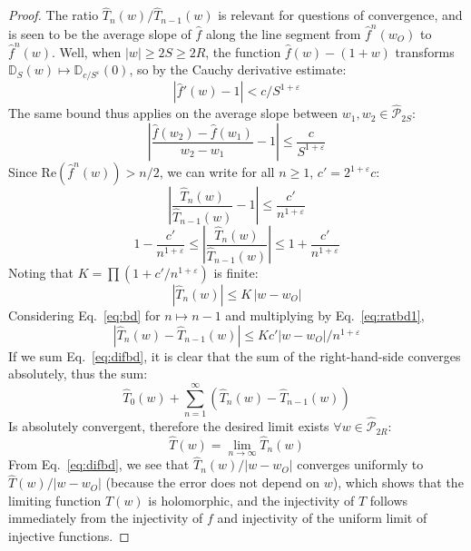 \documentclass{article}
\begin{document}
\begin{proof}
    The ratio $\hat{T}_n(w)/\hat{T}_{n-1}(w)$ is relevant for questions of convergence, and is seen to be the average slope of $\hat{f}$ along the line segment from $\hat{f}^n(w_O)$ to $\hat{f}^n(w)$. Well, when $|w|\ge 2S \ge 2R$, the function $\hat{f}(w)-(1+w)$ transforms $\mathbb{D}_S(w)\mapsto \mathbb{D}_{c/S^\varepsilon}(0)$, so by the Cauchy derivative estimate:
    \begin{equation*}
        \left|\hat{f}'(w)-1\right|<c/S^{1+\varepsilon}
    \end{equation*}
    The same bound thus applies on the average slope between $w_1, w_2\in \hat{\mathcal{P}}_{2S}$:
    \begin{equation*}
        \left|\frac{\hat{f}(w_2)-\hat{f}(w_1)}{w_2-w_1}-1\right|\le \frac{c}{S^{1+\varepsilon}} 
    \end{equation*}
    Since $\mathrm{Re}(\hat{f}^n(w))>n/2$, we can write for all $n\ge 1$, $c'=2^{1+\varepsilon} c$:
    \begin{equation}
        \label{eq:ratbd1}
        \left|\frac{\hat{T}_n(w)}{\hat{T}_{n-1}(w)} - 1\right|\le \frac{c'}{n^{1+\varepsilon}}
    \end{equation}    
    \begin{equation*}
        1-\frac{c'}{n^{1+\varepsilon}} \le 
        \left|\frac{\hat{T}_n(w)}{\hat{T}_{n-1}(w)}\right| \le 1+\frac{c'}{n^{1+\varepsilon}}
    \end{equation*}    
    Noting that $K=\prod\left(1+c'/n^{1+\varepsilon}\right)$ is finite:
    \begin{equation}
        \label{eq:bd}
        \left|\hat{T}_n(w)\right|\le K\, |w-w_O|
    \end{equation}
    Considering Eq.~\ref{eq:bd} for $n\mapsto n-1$ and multiplying by Eq.~\ref{eq:ratbd1},
    \begin{equation}
        \label{eq:difbd}
        \left|\hat{T}_n(w)-\hat{T}_{n-1}(w)\right|\le Kc'|w-w_O|/n^{1+\varepsilon} 
    \end{equation}
    If we sum Eq.~\ref{eq:difbd}, it is clear that the sum of the right-hand-side converges absolutely, thus the sum:
    \begin{equation*}
        \hat{T}_0(w)+\sum_{n=1}^\infty \left({\hat{T}_n(w)-\hat{T}_{n-1}(w)}\right)
    \end{equation*}
    Is absolutely convergent, therefore the desired limit exists $\forall w\in\hat{\mathcal{P}}_{2R}$: 
    \begin{equation*}
        \hat{T}(w)=\lim_{n\to\infty}\hat{T}_n(w)
    \end{equation*}
    From Eq.~\ref{eq:difbd}, we see that $\hat{T}_n(w)/|w-w_O|$ converges uniformly to $\hat{T}(w)/|w-w_O|$ (because the error does not depend on $w$), which shows that the limiting function $T(w)$ is holomorphic, and the injectivity of $T$ follows immediately from the injectivity of $f$ and injectivity of the uniform limit of injective functions. 
\end{proof}
\end{document}
